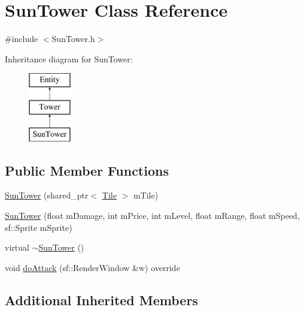 \hypertarget{class_sun_tower}{\section{Sun\+Tower Class Reference}
\label{class_sun_tower}
}


{\ttfamily \#include $<$Sun\+Tower.\+h$>$}

Inheritance diagram for Sun\+Tower\+:\begin{figure}[H]
\begin{center}
\leavevmode
\includegraphics[height=3.000000cm]{class_sun_tower}
\end{center}
\end{figure}
\subsection*{Public Member Functions}
\begin{DoxyCompactItemize}
\item 
\hyperlink{class_sun_tower_aa24e04aa4d64bb77dee9e931b52a3ca5}{Sun\+Tower} (shared\+\_\+ptr$<$ \hyperlink{class_tile}{Tile} $>$ m\+Tile)
\item 
\hyperlink{class_sun_tower_a886c567e4f9c8365336a7c80c2be2af7}{Sun\+Tower} (float m\+Damage, int m\+Price, int m\+Level, float m\+Range, float m\+Speed, sf\+::\+Sprite m\+Sprite)
\item 
virtual \hyperlink{class_sun_tower_ac2ef8bb492fd94f05061eed09ddb900f}{$\sim$\+Sun\+Tower} ()
\item 
void \hyperlink{class_sun_tower_af0453294af7e980271431cab34155cd8}{do\+Attack} (sf\+::\+Render\+Window \&w) override
\end{DoxyCompactItemize}
\subsection*{Additional Inherited Members}


